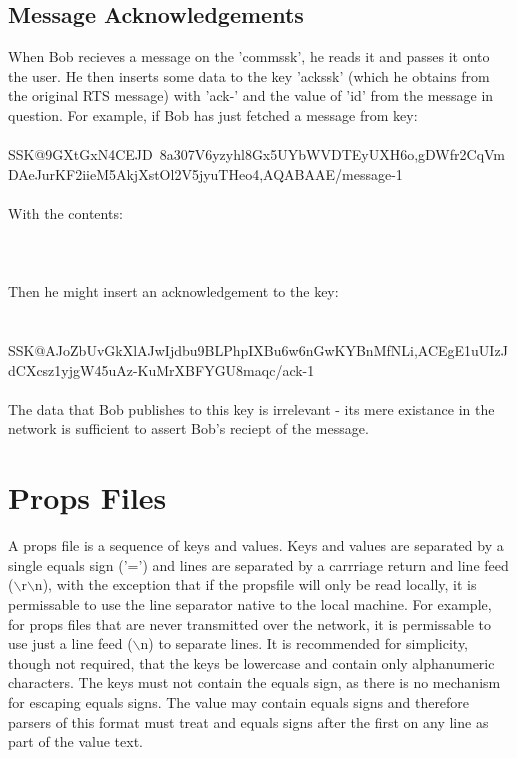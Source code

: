 \documentclass[12pt,a4paper]{article}
\begin{document}
\subsection{Message Acknowledgements}
When Bob recieves a message on the 'commssk', he reads it and passes it onto the user. He then inserts some data to the key 'ackssk' (which he obtains from the original RTS message) with 'ack-' and the value of 'id' from the message in question. For example, if Bob has just fetched a message from key: \\
\\
SSK@9GXtGxN4CEJD~8a\-307V6yzyhl8Gx5U\-YbWVDTEyUXH6o,gDWfr2CqVm\-DAeJurKF2iieM\-5AkjXstOl2V5j\-yuTHeo4,AQABAAE/message-1 \\
\\
With the contents: \\
\\

 \\
\\
Then he might insert an acknowledgement to the key: \\
\\
\\
SSK@AJoZbUvGkXlAJwI\-jdbu9BLPhpIXBu6\-w6nGwKYBnMfNLi,ACEgE1uUIzJdC\-Xcsz1yjgW45u\-Az-KuMrXBFYG\-U8maqc/ack-1 \\
\\
The data that Bob publishes to this key is irrelevant - its mere existance in the network is sufficient to assert Bob's reciept of the message.

\appendix

\section{Props Files}
\label{PropsFile}
A props file is a sequence of keys and values. Keys and values are separated by a single equals sign ('=') and lines are separated by a carrriage return and line feed ($\backslash$r$\backslash$n), with the exception that if the propsfile will only be read locally, it is permissable to use the line separator native to the local machine. For example, for props files that are never transmitted over the network, it is permissable to use just a line feed ($\backslash$n) to separate lines. It is recommended for simplicity, though not required, that the keys be lowercase and contain only alphanumeric characters. The keys must not contain the equals sign, as there is no mechanism for escaping equals signs. The value may contain equals signs and therefore parsers of this format must treat and equals signs after the first on any line as part of the value text.
\end{document}
